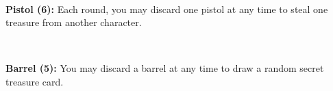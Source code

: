 \begin{minipage}{1.5cm}
\end{minipage}
\ 
\begin{minipage}{5.5cm}
\raggedright
\textbf{Pistol (6):} Each round, you may discard one pistol at any time to steal one treasure from another character.
\end{minipage}

\begin{minipage}{1.5cm}
\end{minipage}
\ 
\begin{minipage}{6cm}
\raggedright
\textbf{Barrel (5):} You may discard a barrel at any time to draw a random secret treasure card. 
\end{minipage}
